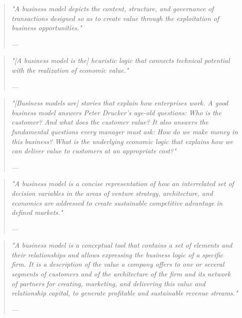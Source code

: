 \begin{quote}{\slshape 
"A business model depicts the content, structure, and governance of transactions designed so as to create value through the exploitation of business opportunities."}
\vspace*{-5pt}
\begin{flushright}
	--- \citet[p. 511]{Amit2001}
\end{flushright}
\end{quote}

\begin{quote}{\slshape 
"[A business model is the] heuristic logic that connects technical potential with the realization of economic value."}
\vspace*{-5pt}
\begin{flushright}
	--- \citet[p. 529]{Chesbrough2002}
\end{flushright}
\end{quote}

\begin{quote}{\slshape 
"[Business models are] stories that explain how enterprises work. A good business model answers Peter Drucker's age-old questions: Who is the customer? And what does the customer value? It also answers the fundamental questions every manager must ask: How do we make money in this business? What is the underlying economic logic that explains how we can deliver value to customers at an appropriate cost?"}
\vspace*{-5pt}
\begin{flushright}
	--- \citet[p. 2]{Magretta2002}
\end{flushright}
\end{quote}

\begin{quote}{\slshape 
"A business model is a concise representation of how an interrelated set of decision variables in the areas of venture strategy, architecture, and economics are addressed to create sustainable competitive advantage in defined markets."}
\vspace*{-5pt}
\begin{flushright}
	--- \citet[p. 727]{Morris2005}
\end{flushright}
\end{quote}

\begin{quote}{\slshape 
"A business model is a conceptual tool that contains a set of elements and their relationships and allows expressing the business logic of a specific firm. It is a description of the value a company offers to one or several segments of customers and of the architecture of the firm and its network of partners for creating, marketing, and delivering this value and relationship capital, to generate profitable and sustainable revenue streams."}
\vspace*{-5pt}
\begin{flushright}
	--- \citet[p. 10]{Osterwalder2005}
\end{flushright}
\end{quote}
	
